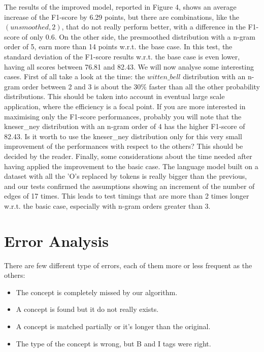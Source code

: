 \documentclass[11pt,a4paper]{article}
\begin{document}
The results of the improved model, reported in Figure 4, shows an average increase of the F1-score by 6.29 points, but there are combinations, like the $(unsmoothed,2)$, that do not really perform better, with a difference in the F1-score of only 0.6. On the other side, the presmoothed distribution with a n-gram order of 5, earn more than 14 points w.r.t. the base case. In this test, the standard deviation of the F1-score results w.r.t. the base case is even lower, having all scores between 76.81 and 82.43. We will now analyse some interesting cases. First of all take a look at the time: the $witten\_bell$ distribution with an n-gram order between 2 and 3 is about the 30\% faster than all the other probability distributions. This should be taken into account in eventual large scale application, where the efficiency is a focal point. If you are more interested in maximising only the F1-score performances, probably you will note that the kneser\_ney distribution with an n-gram order of 4 has the higher F1-score of 82.43. Is it worth to use the kneser\_ney distribution only for this very small improvement of the performances with respect to the others? This should be decided by the reader.
Finally, some considerations about the time needed after having applied the improvement to the basic case. The language model built on a dataset with all the 'O's replaced by tokens is really bigger than the previous, and our tests confirmed the assumptions showing an increment of the number of edges of 17 times. This leads to test timings that are more than 2 times longer w.r.t. the basic case, especially with n-gram orders greater than 3. 

\section{Error Analysis}

There are few different type of errors, each of them more or less frequent as the others:
\begin{itemize}
\item The concept is completely missed by our algorithm.
\item A concept is found but it do not really exists. 
\item A concept is matched partially or it's longer than the original.
\item The type of the concept is wrong, but B and I tags were right.
\end{itemize}
\end{document}
